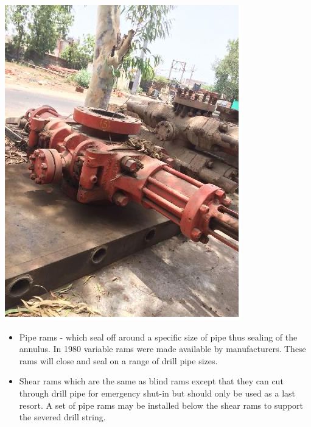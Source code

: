 \includegraphics[scale=0.3]{images/shear_ram_BOP}

\begin{itemize}

\item Pipe rams - which seal off around a specific size of pipe thus
sealing of the annulus. In 1980 variable rams were made
available by manufacturers. These rams will close and seal on a
range of drill pipe sizes.

\vspace{1em}

\item Shear rams which are the same as blind rams except that they
can cut through drill pipe for emergency shut-in but should only
be used as a last resort. A set of pipe rams may be installed
below the shear rams to support the severed drill string.

\end{itemize}





